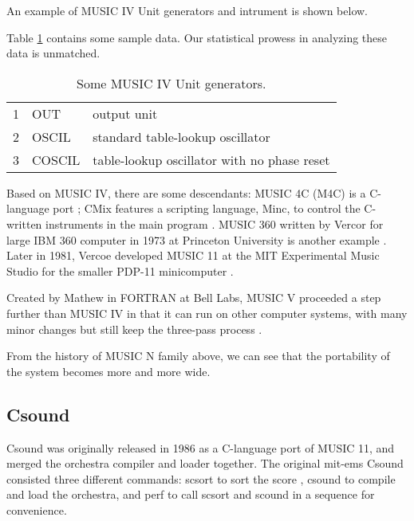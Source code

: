 \documentclass[jou]{apa6}
\begin{document}
An example of MUSIC IV Unit generators and intrument is shown below.

Table \ref{tab:ComplexTable} contains some sample data.  Our
statistical prowess in analyzing these data is unmatched.

\begin{table}[htbp]
  \vspace*{2em}
  \begin{threeparttable}
    \caption{Some MUSIC IV Unit generators.}
    \label{tab:ComplexTable}
    \begin{tabular}{@{}lll@{}}         \toprule
    1 &    OUT    &     output unit     \\
    2 &    OSCIL  &     standard table-lookup oscillator   \\
    3 &    COSCIL &     table-lookup oscillator with no phase reset  \\ \midrule
    \end{tabular}
  \end{threeparttable}
\end{table}

Based on MUSIC IV, there are some descendants: MUSIC 4C (M4C) is a
C-language port \parencite{beauchamp1996introduction}; CMix features 
a scripting language, Minc, to control the C-written instruments in 
the main program \parencite{pope1993machine}. MUSIC 360 written by
Vercor for large IBM 360 computer in 1973 at Princeton University
is another example \parencite{lefford1999interview}. Later in 1981,
Vercoe developed MUSIC 11 at the MIT Experimental Music Studio for 
the smaller PDP-11 minicomputer \parencite{vercoe1981reference}.

Created by Mathew in FORTRAN at Bell Labs, MUSIC V proceeded a step
further than MUSIC IV in that it can run on other computer systems, 
with many minor changes but still keep the three-pass 
process \parencite{mathews1969technology}. 

From the history of MUSIC N family above, we can see that the 
portability of the system becomes more and more wide.

\subsection{Csound}
Csound was originally released in 1986 as a C-language port of 
MUSIC 11, and merged the orchestra compiler and loader together.
The original mit-ems Csound consisted three different commands:
\textsf{scsort} to sort the score , \textsf{csound} to compile 
and load the orchestra, and \textsf{perf} to call scsort 
and scound in a sequence for convenience.
\end{document}
